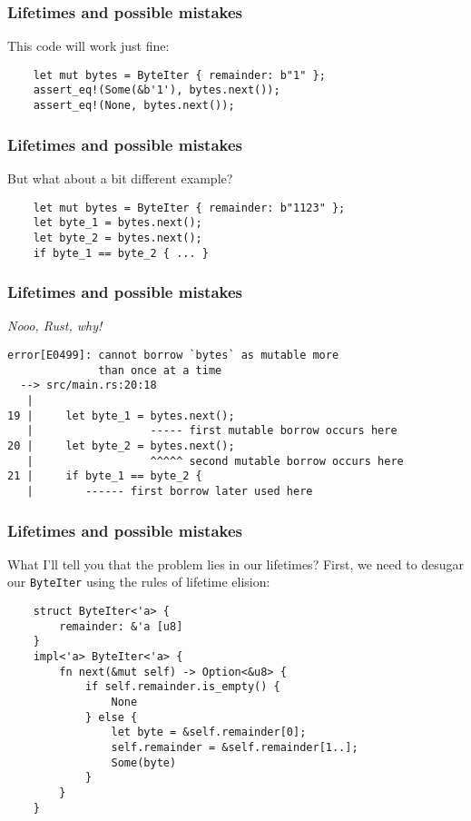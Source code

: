\documentclass[aspectratio=1610,t]{beamer}
\begin{document}

\begin{frame}[fragile]
\frametitle{Lifetimes and possible mistakes}
This code will work just fine:

\begin{verbatim}
    let mut bytes = ByteIter { remainder: b"1" };
    assert_eq!(Some(&b'1'), bytes.next());
    assert_eq!(None, bytes.next());
\end{verbatim}
\end{frame}


\begin{frame}[fragile]
\frametitle{Lifetimes and possible mistakes}
But what about a bit different example?

\begin{verbatim}
    let mut bytes = ByteIter { remainder: b"1123" };
    let byte_1 = bytes.next();
    let byte_2 = bytes.next();
    if byte_1 == byte_2 { ... }
\end{verbatim}
\end{frame}


\begin{frame}[fragile]
\frametitle{Lifetimes and possible mistakes}
\textit{Nooo, Rust, why!}

\begin{verbatim}
error[E0499]: cannot borrow `bytes` as mutable more
              than once at a time
  --> src/main.rs:20:18
   |
19 |     let byte_1 = bytes.next();
   |                  ----- first mutable borrow occurs here
20 |     let byte_2 = bytes.next();
   |                  ^^^^^ second mutable borrow occurs here
21 |     if byte_1 == byte_2 {
   |        ------ first borrow later used here
\end{verbatim}
\end{frame}


\begin{frame}[fragile]
\frametitle{Lifetimes and possible mistakes}
What I'll tell you that the problem lies in our lifetimes? First, we need to desugar our \texttt{ByteIter} using the rules of lifetime elision:

\begin{verbatim}
    struct ByteIter<'a> {
        remainder: &'a [u8]
    }
    impl<'a> ByteIter<'a> {
        fn next(&mut self) -> Option<&u8> {
            if self.remainder.is_empty() {
                None
            } else {
                let byte = &self.remainder[0];
                self.remainder = &self.remainder[1..];
                Some(byte)
            }
        }
    }
\end{verbatim}
\end{frame}
\end{document}
